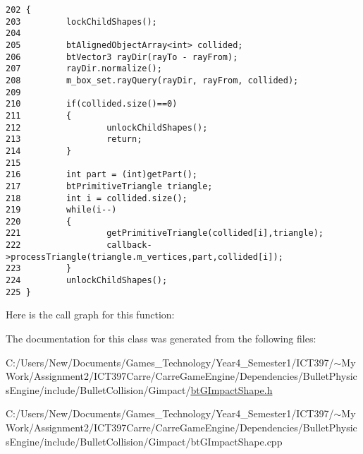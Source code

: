 \begin{Code}\begin{verbatim}202 {
203         lockChildShapes();
204 
205         btAlignedObjectArray<int> collided;
206         btVector3 rayDir(rayTo - rayFrom);
207         rayDir.normalize();
208         m_box_set.rayQuery(rayDir, rayFrom, collided);
209 
210         if(collided.size()==0)
211         {
212                 unlockChildShapes();
213                 return;
214         }
215 
216         int part = (int)getPart();
217         btPrimitiveTriangle triangle;
218         int i = collided.size();
219         while(i--)
220         {
221                 getPrimitiveTriangle(collided[i],triangle);
222                 callback->processTriangle(triangle.m_vertices,part,collided[i]);
223         }
224         unlockChildShapes();
225 }
\end{verbatim}
\end{Code}




Here is the call graph for this function:

The documentation for this class was generated from the following files:\begin{CompactItemize}
\item 
C:/Users/New/Documents/Games\_\-Technology/Year4\_\-Semester1/ICT397/$\sim$My Work/Assignment2/ICT397Carre/CarreGameEngine/Dependencies/BulletPhysicsEngine/include/BulletCollision/Gimpact/\hyperlink{bt_g_impact_shape_8h}{btGImpactShape.h}\item 
C:/Users/New/Documents/Games\_\-Technology/Year4\_\-Semester1/ICT397/$\sim$My Work/Assignment2/ICT397Carre/CarreGameEngine/Dependencies/BulletPhysicsEngine/include/BulletCollision/Gimpact/btGImpactShape.cpp\end{CompactItemize}
